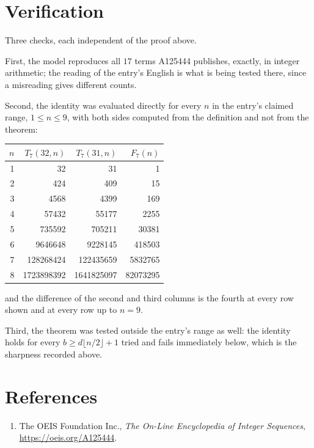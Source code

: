 \documentclass[11pt,a4paper]{article}
\theoremstyle{plain}
\theoremstyle{definition}
\begin{document}
\section{Verification}

Three checks, each independent of the proof above.

First, the model reproduces all $17$ terms A125444 publishes, exactly, in integer
arithmetic; the reading of the entry's English is what is being tested there, since a
misreading gives different counts.

Second, the identity was evaluated directly for every $n$ in the entry's claimed range,
$1\le n\le9$, with both sides computed from the definition and not from the theorem:

\begin{center}
\begin{tabular}{rrrr}
$n$ & $T_{7}(32,n)$ & $T_{7}(31,n)$ & $F_{7}(n)$ \\ \hline
1 & 32 & 31 & 1 \\
2 & 424 & 409 & 15 \\
3 & 4568 & 4399 & 169 \\
4 & 57432 & 55177 & 2255 \\
5 & 735592 & 705211 & 30381 \\
6 & 9646648 & 9228145 & 418503 \\
7 & 128268424 & 122435659 & 5832765 \\
8 & 1723898392 & 1641825097 & 82073295 \\
\end{tabular}
\end{center}

\noindent and the difference of the second and third columns is the fourth at every row shown
and at every row up to $n=9$.

Third, the theorem was tested outside the entry's range as well: the identity holds for every
$b\ge d\lfloor n/2\rfloor+1$ tried and fails immediately below, which is the sharpness recorded
above.

\section*{References}
\begin{enumerate}
\item The OEIS Foundation Inc., \emph{The On-Line Encyclopedia of Integer Sequences},
\url{https://oeis.org/A125444}.
\end{enumerate}
\end{document}
